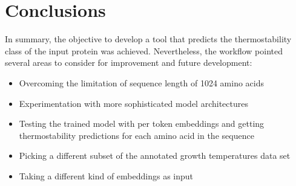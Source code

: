 \documentclass[12pt]{article}
\begin{document}
	\newpage

	\section{Conclusions}

	In summary, the objective to develop a tool that predicts the thermostability
	class of the input protein was achieved. Nevertheless, the workflow pointed
	several areas to consider for improvement and future development:

	\begin{itemize}
		\item Overcoming the limitation of sequence length of 1024 amino acids
		\item Experimentation with more sophisticated model architectures
		\item Testing the trained model with per token embeddings and getting 
			  thermostability predictions for each amino acid in the sequence
		\item Picking a different subset of the annotated growth temperatures 
			  data set  
		\item Taking a different kind of embeddings as input
	\end{itemize}

	\newpage
	
	\nocite{*}
	
	\normalsize

 

\end{document}
